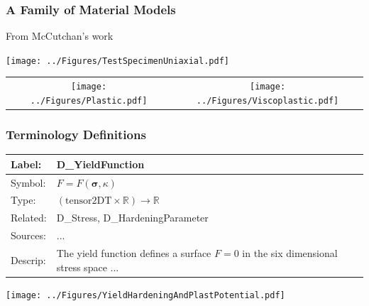 \documentclass[t,12pt,numbers,fleqn]{beamer}
\newcommand{\colAwidth}{0.15\textwidth}
\newcommand{\colBwidth}{0.7\textwidth}
\begin{document}

\begin{frame}

\frametitle{A Family of Material Models}

From McCutchan's work \cite{CaretteEtAl2008, SmithMcCutchanAndCao2007,
  SmithEtAl2008, CaretteEtAl2007_TR, SmithMcCutchanAndCarette2017, McCutchan2007}

\begin{center}
{
\texttt{[image: ../Figures/TestSpecimenUniaxial.pdf]}
}
\end{center}

\begin{center}
\begin{tabular}{cc}
\texttt{[image: ../Figures/Plastic.pdf]} &
\texttt{[image: ../Figures/Viscoplastic.pdf]}\\
\end{tabular}
\end{center}

\end{frame}


\begin{frame}

\frametitle{Terminology Definitions}

\begin{minipage}{\textwidth}
\begin{tabular}{| p{\colAwidth} | p{\colBwidth}|}
\hline
\rowcolor[gray]{0.9}
Label: & D\_YieldFunction\\ \hline
Symbol: & $F = F(\bm{\sigma}, \kappa)$\\ \hline
Type: & $(\mbox{tensor2DT} \times \mathbb{R}) \rightarrow \mathbb{R}$\\ \hline
Related: & {D\_Stress}, {D\_HardeningParameter}\\ \hline %
Sources: & ...\\
\hline Descrip: & The yield function defines a surface $F = 0$ in the six dimensional stress space ...\\
\hline
\end{tabular}
\end{minipage}

\begin{center}
{
\texttt{[image: ../Figures/YieldHardeningAndPlastPotential.pdf]}
}
\end{center}

\end{frame}
\end{document}
